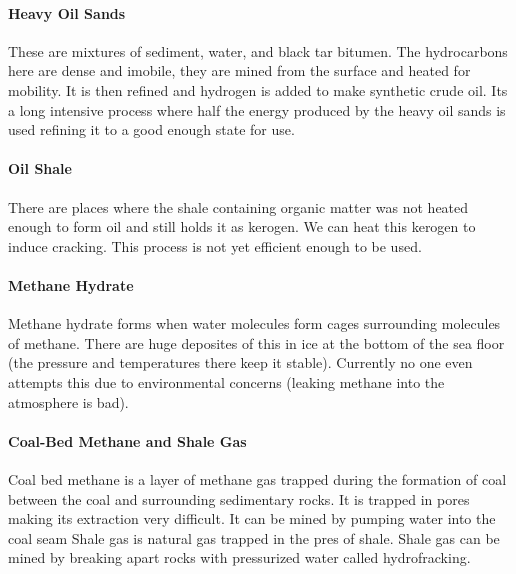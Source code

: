 \documentclass{article}
\begin{document}
\paragraph{Heavy Oil Sands} %
\label{par:heavy_oil_sands}
These are mixtures of sediment, water, and black tar bitumen. The hydrocarbons here are dense and imobile, they are mined from the surface and heated for mobility. It is then refined and hydrogen is added to make synthetic crude oil. Its a long intensive process where half the energy produced by the heavy oil sands is used refining it to a good enough state for use.

\paragraph{Oil Shale} %
\label{par:oil_shale}
There are places where the shale containing organic matter was not heated enough to form oil and still holds it as kerogen. We can heat this kerogen to induce cracking. This process is not yet efficient enough to be used.

\paragraph{Methane Hydrate} %
\label{par:methane_hydrate}
Methane hydrate forms when water molecules form cages surrounding molecules of methane. There are huge deposites of this in ice at the bottom of the sea floor (the pressure and temperatures there keep it stable). Currently no one even attempts this due to environmental concerns (leaking methane into the atmosphere is bad).

\paragraph{Coal-Bed Methane and Shale Gas} %
\label{par:coal_bed_methane_and_shale_gas}
Coal bed methane is a layer of methane gas trapped during the formation of coal between the coal and surrounding sedimentary rocks. It is trapped in pores making its extraction very difficult. It can be mined by pumping water into the coal seam Shale gas is natural gas trapped in the pres of shale. Shale gas can be mined by breaking apart rocks with pressurized water called hydrofracking.

\end{document}
